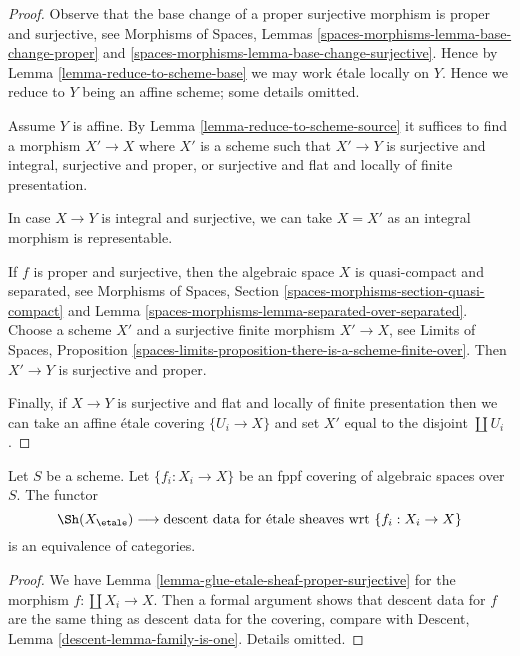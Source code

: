 \begin{proof}
Observe that the base change of a proper surjective morphism is
proper and surjective, see
Morphisms of Spaces, Lemmas \ref{spaces-morphisms-lemma-base-change-proper}
and \ref{spaces-morphisms-lemma-base-change-surjective}.
Hence by Lemma \ref{lemma-reduce-to-scheme-base}
we may work \'etale locally on $Y$. Hence
we reduce to $Y$ being an affine scheme; some details omitted.

\medskip\noindent
Assume $Y$ is affine. By Lemma \ref{lemma-reduce-to-scheme-source}
it suffices to find a morphism $X' \to X$ where $X'$ is a scheme such
that $X' \to Y$ is surjective and integral, surjective and proper, or
surjective and flat and locally of finite presentation.

\medskip\noindent
In case $X \to Y$ is integral and surjective, we can take $X = X'$
as an integral morphism is representable.

\medskip\noindent
If $f$ is proper and surjective, then the algebraic space
$X$ is quasi-compact and separated, see
Morphisms of Spaces, Section \ref{spaces-morphisms-section-quasi-compact} and
Lemma \ref{spaces-morphisms-lemma-separated-over-separated}.
Choose a scheme $X'$ and a surjective finite morphism $X' \to X$, see
Limits of Spaces, Proposition
\ref{spaces-limits-proposition-there-is-a-scheme-finite-over}.
Then $X' \to Y$ is surjective and proper.

\medskip\noindent
Finally, if $X \to Y$ is surjective and flat and locally of finite
presentation then we can take an affine \'etale covering $\{U_i \to X\}$
and set $X'$ equal to the disjoint $\coprod U_i$.
\end{proof}

\begin{lemma}
\label{lemma-glue-etale-sheaf-fppf}
Let $S$ be a scheme.
Let $\{f_i : X_i \to X\}$ be an fppf covering of algebraic spaces over $S$.
The functor
$$
\Sh(X_\etale)
\longrightarrow
\text{descent data for \'etale sheaves wrt }\{f_i : X_i \to X\}
$$
is an equivalence of categories.
\end{lemma}

\begin{proof}
We have Lemma \ref{lemma-glue-etale-sheaf-proper-surjective}
for the morphism $f : \coprod X_i \to X$.
Then a formal argument shows that descent data for $f$
are the same thing as descent data for the covering, compare
with Descent, Lemma \ref{descent-lemma-family-is-one}.
Details omitted.
\end{proof}

